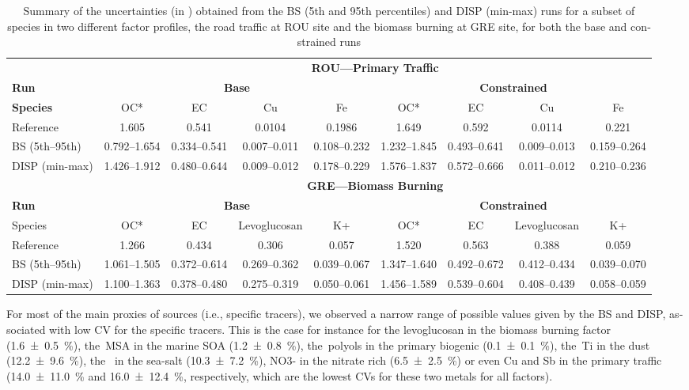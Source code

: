 \begin{otherlanguage}{english}
\begin{sidewaystable}
    \centering
    \caption{Summary of the uncertainties (in \si{\concum}) obtained from the BS
        (5{th} and 95{th} percentiles) and DISP
        (min-max) runs for a subset of species in two different factor profiles,
        the road traffic at ROU site and the biomass burning at GRE site, for both
      the base and constrained runs}
    \label{tab:uncertainties_constraints}
    \begin{tabular}{lcccccccc}
        \toprule
        & \multicolumn{8}{c}{\textbf{ROU---Primary Traffic}}\\
       \textbf{ Run} & \multicolumn{4}{c}{\textbf{Base}} & \multicolumn{4}{c}{\textbf{Constrained}} \\
        \midrule
\textbf{Species} & OC* & EC & Cu & Fe & OC* & EC & Cu & Fe\\
Reference  & 1.605 & 0.541 & 0.0104 & 0.1986 & 1.649 & 0.592 & 0.0114 & 0.221\\
BS (5{th}--95{th}) & 0.792--1.654 & 0.334--0.541 & 0.007--0.011 & 0.108--0.232 & 1.232--1.845 & 0.493--0.641 & 0.009--0.013 & 0.159--0.264\\
DISP (min-max) & 1.426--1.912 & 0.480--0.644 & 0.009--0.012 & 0.178--0.229 & 1.576--1.837 & 0.572--0.666 & 0.011--0.012 & 0.210--0.236 \\
        \toprule
        & \multicolumn{8}{c}{\textbf{GRE---Biomass Burning}}\\
\textbf{Run} & \multicolumn{4}{c}{\textbf{Base}} & \multicolumn{4}{c}{\textbf{Constrained}} \\
        \midrule
Species & OC* & EC & Levoglucosan & K+ & OC* & EC & Levoglucosan & K+\\
Reference & 1.266 & 0.434 & 0.306 & 0.057 & 1.520 & 0.563 & 0.388 & 0.059\\
BS (5{th}--95{th}) & 1.061--1.505 & 0.372--0.614 & 0.269--0.362 & 0.039--0.067 & 1.347--1.640 & 0.492--0.672 & 0.412--0.434 & 0.039--0.070\\
DISP (min-max) & 1.100--1.363 & 0.378--0.480 & 0.275--0.319 & 0.050--0.061 & 1.456--1.589 & 0.539--0.604 & 0.408--0.439 & 0.058--0.059\\
\bottomrule
    \end{tabular}
\end{sidewaystable}



For most of the main proxies of sources (i.e., specific tracers), we observed a narrow
range of possible values given by the BS and DISP, associated with low CV for the specific
tracers. This is the case for instance for the levoglucosan in the biomass burning factor
(\SI{1.6\pm0.5}{\percent}), the~MSA in the marine SOA (\SI{1.2\pm0.8}{\percent}),
the~polyols in the primary biogenic (\SI{0.1\pm0.1}{\percent}), the~Ti in the dust
(\SI{12.2\pm9.6}{\percent}), the~ in the sea-salt (\SI{10.3\pm7.2}{\percent}),
NO3- in the nitrate rich (\SI{6.5\pm2.5}{\percent}) or even Cu and Sb in the primary
traffic (\SI{14.0\pm11.0}{\percent} and \SI{16.0\pm12.4}{\percent}, respectively, which
are the lowest CVs for these two metals for all factors).


\end{otherlanguage}

